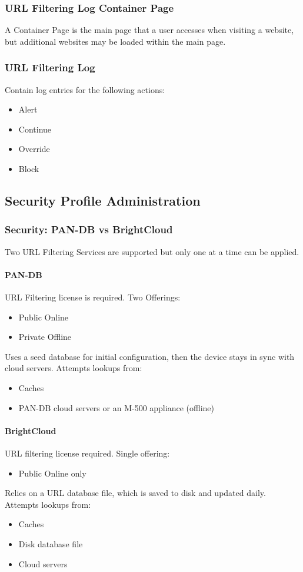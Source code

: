 \subsubsection{URL Filtering Log Container Page}
A Container Page is the main page that a user accesses when visiting a website, but additional websites may be loaded within the main page.

\subsubsection{URL Filtering Log}
Contain log entries for the following actions:
\begin{itemize}
    \item Alert
    \item Continue
    \item Override
    \item Block
\end{itemize}

\subsection{Security Profile Administration}
\subsubsection{Security: PAN-DB vs BrightCloud}
Two URL Filtering Services are supported but only one at a time can be applied.
\paragraph{PAN-DB}
URL Filtering license is required. Two Offerings:
    \begin{itemize}
        \item Public Online
        \item Private Offline
    \end{itemize}
Uses a seed database for initial configuration, then the device stays in sync with cloud servers.
Attempts lookups from:
\begin{itemize}
    \item Caches
    \item PAN-DB cloud servers or an M-500 appliance (offline)
\end{itemize}

\paragraph{BrightCloud}
URL filtering license required. Single offering:
\begin{itemize}
    \item Public Online only
\end{itemize}
Relies on a URL database file, which is saved to disk and updated daily.
Attempts lookups from:
\begin{itemize}
    \item Caches
    \item Disk database file
    \item Cloud servers
\end{itemize}

